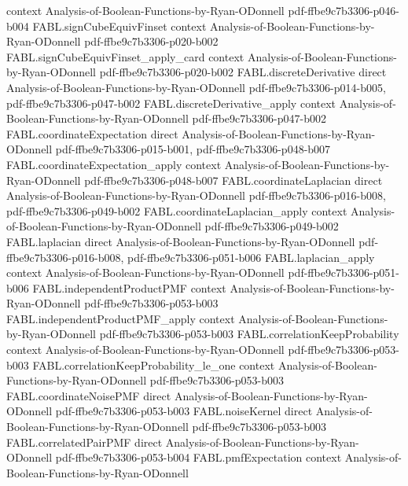 \begin{theorem}
  {context}
  {Analysis-of-Boolean-Functions-by-Ryan-ODonnell}
  {pdf-ffbe9c7b3306-p046-b004}
\proofstep
  {FABL.signCubeEquivFinset}
  {context}
  {Analysis-of-Boolean-Functions-by-Ryan-ODonnell}
  {pdf-ffbe9c7b3306-p020-b002}
\proofstep
  {FABL.signCubeEquivFinset_apply_card}
  {context}
  {Analysis-of-Boolean-Functions-by-Ryan-ODonnell}
  {pdf-ffbe9c7b3306-p020-b002}
\proofstep
  {FABL.discreteDerivative}
  {direct}
  {Analysis-of-Boolean-Functions-by-Ryan-ODonnell}
  {pdf-ffbe9c7b3306-p014-b005,
    pdf-ffbe9c7b3306-p047-b002}
\proofstep
  {FABL.discreteDerivative_apply}
  {context}
  {Analysis-of-Boolean-Functions-by-Ryan-ODonnell}
  {pdf-ffbe9c7b3306-p047-b002}
\proofstep
  {FABL.coordinateExpectation}
  {direct}
  {Analysis-of-Boolean-Functions-by-Ryan-ODonnell}
  {pdf-ffbe9c7b3306-p015-b001,
    pdf-ffbe9c7b3306-p048-b007}
\proofstep
  {FABL.coordinateExpectation_apply}
  {context}
  {Analysis-of-Boolean-Functions-by-Ryan-ODonnell}
  {pdf-ffbe9c7b3306-p048-b007}
\proofstep
  {FABL.coordinateLaplacian}
  {direct}
  {Analysis-of-Boolean-Functions-by-Ryan-ODonnell}
  {pdf-ffbe9c7b3306-p016-b008,
    pdf-ffbe9c7b3306-p049-b002}
\proofstep
  {FABL.coordinateLaplacian_apply}
  {context}
  {Analysis-of-Boolean-Functions-by-Ryan-ODonnell}
  {pdf-ffbe9c7b3306-p049-b002}
\proofstep
  {FABL.laplacian}
  {direct}
  {Analysis-of-Boolean-Functions-by-Ryan-ODonnell}
  {pdf-ffbe9c7b3306-p016-b008,
    pdf-ffbe9c7b3306-p051-b006}
\proofstep
  {FABL.laplacian_apply}
  {context}
  {Analysis-of-Boolean-Functions-by-Ryan-ODonnell}
  {pdf-ffbe9c7b3306-p051-b006}
\proofstep
  {FABL.independentProductPMF}
  {context}
  {Analysis-of-Boolean-Functions-by-Ryan-ODonnell}
  {pdf-ffbe9c7b3306-p053-b003}
\proofstep
  {FABL.independentProductPMF_apply}
  {context}
  {Analysis-of-Boolean-Functions-by-Ryan-ODonnell}
  {pdf-ffbe9c7b3306-p053-b003}
\proofstep
  {FABL.correlationKeepProbability}
  {context}
  {Analysis-of-Boolean-Functions-by-Ryan-ODonnell}
  {pdf-ffbe9c7b3306-p053-b003}
\proofstep
  {FABL.correlationKeepProbability_le_one}
  {context}
  {Analysis-of-Boolean-Functions-by-Ryan-ODonnell}
  {pdf-ffbe9c7b3306-p053-b003}
\proofstep
  {FABL.coordinateNoisePMF}
  {direct}
  {Analysis-of-Boolean-Functions-by-Ryan-ODonnell}
  {pdf-ffbe9c7b3306-p053-b003}
\proofstep
  {FABL.noiseKernel}
  {direct}
  {Analysis-of-Boolean-Functions-by-Ryan-ODonnell}
  {pdf-ffbe9c7b3306-p053-b003}
\proofstep
  {FABL.correlatedPairPMF}
  {direct}
  {Analysis-of-Boolean-Functions-by-Ryan-ODonnell}
  {pdf-ffbe9c7b3306-p053-b004}
\proofstep
  {FABL.pmfExpectation}
  {context}
  {Analysis-of-Boolean-Functions-by-Ryan-ODonnell}

\end{theorem}
